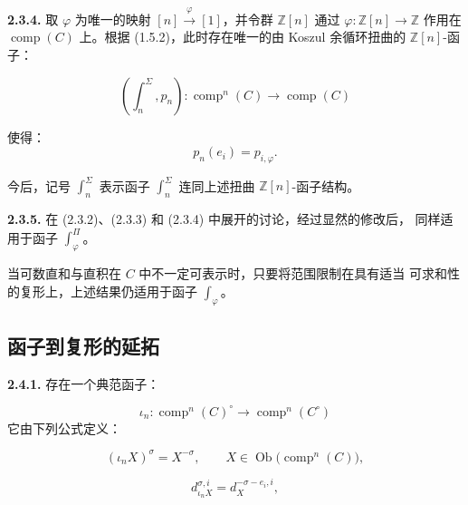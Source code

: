 \clearpage
{}%
\noindent\textbf{2.3.4.}\quad
取 $\varphi$ 为唯一的映射 $[n]\xrightarrow{\varphi}[1]$，并令群
$\mathbb Z[n]$ 通过
$\varphi\colon\mathbb Z[n]\longrightarrow\mathbb Z$ 作用在
$\operatorname{comp}(C)$ 上。根据 (1.5.2)，此时存在唯一的由
Koszul 余循环扭曲的 $\mathbb Z[n]$-函子：

\begin{equation}
  \left(\int_n^\Sigma,p_n\right)\colon
  \operatorname{comp}^{n}(C)\longrightarrow\operatorname{comp}(C)
  \tag{2.3.4.1}
\end{equation}

使得：
\begin{equation*}
  p_n(e_i)=p_{i,\varphi}.
\end{equation*}

今后，记号 $\int_n^\Sigma$ 表示函子
$\int_n^\Sigma$ 连同上述扭曲 $\mathbb Z[n]$-函子结构。

\noindent\textbf{2.3.5.}\quad
在 (2.3.2)、(2.3.3) 和 (2.3.4) 中展开的讨论，经过显然的修改后，
同样适用于函子 $\int_\varphi^\Pi$。

当可数直和与直积在 $C$ 中不一定可表示时，只要将范围限制在具有适当
可求和性的复形上，上述结果仍适用于函子 $\int_\varphi$。

\subsection{函子到复形的延拓}

\noindent\textbf{2.4.1.}\quad
存在一个典范函子：

\begin{equation}
  \iota_n\colon
  \operatorname{comp}^{n}(C)^\circ
  \longrightarrow
  \operatorname{comp}^{n}(C^\circ)
  \tag{2.4.1.1}
\end{equation}
它由下列公式定义：

\begin{equation*}
  (\iota_nX)^\sigma=X^{-\sigma},
  \qquad X\in\operatorname{Ob}\bigl(\operatorname{comp}^{n}(C)\bigr),
\end{equation*}

\begin{equation}
  d_{\iota_nX}^{\sigma,i}=d_X^{-\sigma-e_i,i},
  \tag{2.4.1.2}
\end{equation}

